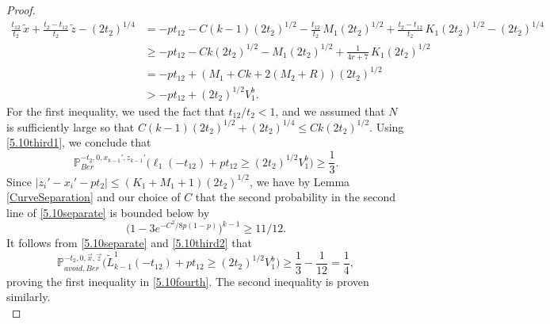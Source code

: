 \begin{proof}
	\begin{align*}
	\frac{t_{12}}{t_2}\,\tilde{x} + \frac{t_2-t_{12}}{t_2}\,\tilde{z} - (2t_2)^{1/4} &= -pt_{12} - C(k-1)(2t_2)^{1/2} - \frac{t_{12}}{t_2}\,M_1(2t_2)^{1/2} + \frac{t_2-t_{12}}{t_2}\,K_1(2t_2)^{1/2} - (2t_2)^{1/4}\\ 
	&\geq -pt_{12} - Ck(2t_2)^{1/2} - M_1(2t_2)^{1/2} + \frac{1}{4r+7}\,K_1(2t_2)^{1/2}\\
	&= -pt_{12} + (M_1 + Ck + 2(M_2+R))(2t_2)^{1/2}\\
	&> -pt_{12} + (2t_2)^{1/2}V_1^b.
	\end{align*}
	For the first inequality, we used the fact that $t_{12}/t_2 < 1$, and we assumed that $N$ is sufficiently large so that $C(k-1)(2t_2)^{1/2} + (2t_2)^{1/4} \leq Ck(2t_2)^{1/2}$. Using \eqref{5.10third1}, we conclude that
	\begin{equation}\label{5.10third2}
	\mathbb{P}^{-t_2,0,x_{k-1}',z_{k-1}'}_{Ber}\Big(\ell_1(-t_{12}) + pt_{12} \geq (2t_2)^{1/2}V_1^b\Big) \geq \frac{1}{3}.
	\end{equation}
	Since $|z_i'-x_i'-pt_2| \leq (K_1+M_1+1)(2t_2)^{1/2}$, we have by Lemma \ref{CurveSeparation} and our choice of $C$ that the second probability in the second line of \eqref{5.10separate} is bounded below by
	\[
	\big(1-3e^{-C^2/8p(1-p)}\big)^{k-1} \geq 11/12.
	\]
	It follows from \eqref{5.10separate} and \eqref{5.10third2} that
	\begin{equation*}
	\mathbb{P}^{-t_2,0,\vec{x},\vec{z}}_{avoid,Ber}\Big(\tilde{L}^1_{k-1}(-t_{12}) + pt_{12} \geq (2t_2)^{1/2}V_1^b\Big) \geq \frac{1}{3} - \frac{1}{12} = \frac{1}{4},
	\end{equation*}
	proving the first inequality in \eqref{5.10fourth}. The second inequality is proven similarly.
	\\
	

\end{proof}
